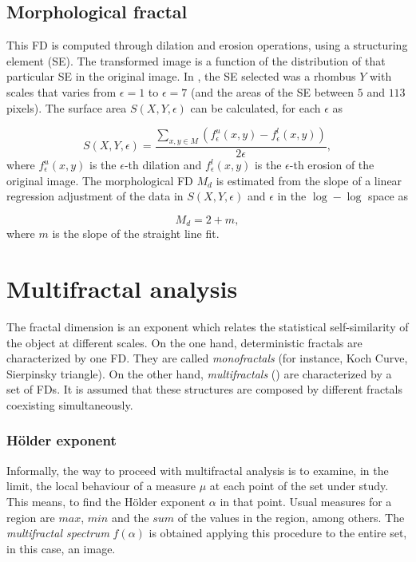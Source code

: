 \documentclass[oneside,a4paper,english,links,12pt]{article}
\begin{document}
\subsection{Morphological fractal}
This FD is computed through dilation and erosion operations, using a structuring element (SE). The transformed image is a function of the distribution of that particular SE in the original image.  In \cite{Gonzales2008}, the SE selected was a rhombus $Y$ with scales that varies from $\epsilon = 1$ to $\epsilon = 7$ (and the areas of the SE between $5$ and $113$ pixels). The surface area $S(X,Y,\epsilon)$ can be calculated, for each $\epsilon$ as

\begin{equation}
S(X,Y,\epsilon) = \frac{\sum_{x,y \in M} (f_{\epsilon}^{u}(x,y) - f_{\epsilon}^{l}(x,y))}{2\epsilon},
\label{eqn:eqn2}
\end{equation}
\noindent
where $f_{\epsilon}^{u}(x,y)$ is the $\epsilon$-th dilation and $f_{\epsilon}^{l}(x,y)$ is the $\epsilon$-th erosion of the original image. The morphological FD $M_{d}$ is estimated from the slope of a linear regression adjustment of the data in $S(X,Y,\epsilon)$ and $\epsilon$ in the $\log-\log$ space as

\begin{equation}
M_{d} = 2 + m,
\label{eqn:eqn3}
\end{equation}
\noindent
where $m$ is the slope of the straight line fit.

\section{Multifractal analysis}
The fractal dimension is an exponent which relates the statistical self-similarity of the object at different scales. On the one hand, deterministic fractals are characterized by one FD. They are called {\em monofractals} (for instance, Koch Curve, Sierpinsky triangle). On the other hand, {\em multifractals} (\cite{Mandelbrot89}) are characterized by a set of FDs. It is assumed that these structures are composed by different fractals coexisting simultaneously.

\subsubsection{H\"older exponent}
Informally, the way to proceed with multifractal analysis is to examine, in the limit, the local behaviour of a measure $\mu$ at each point of the set under study. This means, to find the H\"older exponent $\alpha$ in that point. Usual measures for a region are $max$, $min$ and the $sum$ of the values in the region, among others. The {\em multifractal spectrum} $f(\alpha)$ is obtained applying this procedure to the entire set, in this case, an image.
\end{document}
